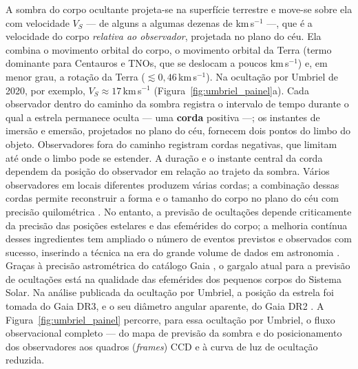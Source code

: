 A sombra do corpo ocultante projeta-se na superfície terrestre e move-se sobre ela com velocidade \(V_S\) --- de alguns a algumas dezenas de km\,s\(^{-1}\) ---, que é a velocidade do corpo \emph{relativa ao observador}, projetada no plano do céu. Ela combina o movimento orbital do corpo, o movimento orbital da Terra (termo dominante para Centauros e TNOs, que se deslocam a poucos km\,s\(^{-1}\)) e, em menor grau, a rotação da Terra (\(\lesssim 0{,}46\)\,km\,s\(^{-1}\)). Na ocultação por Umbriel de 2020, por exemplo, \(V_S \approx 17\)\,km\,s\(^{-1}\) (Figura~\ref{fig:umbriel_painel}a). Cada observador dentro do caminho da sombra registra o intervalo de tempo durante o qual a estrela permanece oculta --- uma \textbf{corda} positiva ---; os instantes de imersão e emersão, projetados no plano do céu, fornecem dois pontos do limbo do objeto. Observadores fora do caminho registram cordas negativas, que limitam até onde o limbo pode se estender. A duração e o instante central da corda dependem da posição do observador em relação ao trajeto da sombra. Vários observadores em locais diferentes produzem várias cordas; a combinação dessas cordas permite reconstruir a forma e o tamanho do corpo no plano do céu com precisão quilométrica \citep{Ortiz2020, Umbriel2020}. No entanto, a previsão de ocultações depende criticamente da precisão das posições estelares e das efemérides do corpo; a melhoria contínua desses ingredientes tem ampliado o número de eventos previstos e observados com sucesso, inserindo a técnica na era do grande volume de dados em astronomia \citep{SORA2022, Knieling2024}. Graças à precisão astrométrica do catálogo Gaia \citep{Gaia2016, GaiaDR3}, o gargalo atual para a previsão de ocultações está na qualidade das efemérides dos pequenos corpos do Sistema Solar. Na análise publicada da ocultação por Umbriel, a posição da estrela foi tomada do Gaia DR3, e o seu diâmetro angular aparente, do Gaia DR2 \citep{Umbriel2020}. A Figura~\ref{fig:umbriel_painel} percorre, para essa ocultação por Umbriel, o fluxo observacional completo --- do mapa de previsão da sombra e do posicionamento dos observadores aos quadros (\textit{frames}) CCD e à curva de luz de ocultação reduzida.

